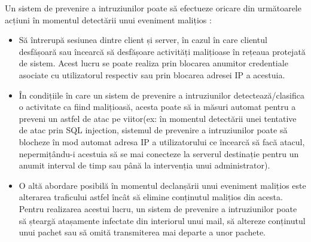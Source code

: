 Un sistem de prevenire a intruziunilor poate să efectueze oricare din următoarele acțiuni în momentul detectării unui eveniment malițios  \cite{ips_fire}:
\begin{itemize}
	\item  Să întrerupă sesiunea dintre client și server, în cazul în care clientul desfășoară sau încearcă să desfășoare activități malițioase în rețeaua protejată de sistem. Acest lucru se poate realiza prin blocarea anumitor credentiale asociate cu utilizatorul respectiv sau prin blocarea adresei IP a acestuia. 
	\item  În condițiile în care un sistem de prevenire a intruziunilor detectează/clasifica o activitate ca fiind malițioasă, acesta poate să ia măsuri automat pentru a preveni un astfel de atac pe viitor(ex: în momentul detectării unei tentative de atac prin SQL injection, sistemul de prevenire a intruziunilor poate să blocheze în mod automat adresa IP a utilizatorului ce încearcă să facă atacul, nepermițându-i acestuia să se mai conecteze la serverul destinație pentru un anumit interval de timp sau până la intervenția unui administrator). 
	\item  O altă abordare posibilă în momentul declanșării unui eveniment malițios este alterarea traficului astfel încât să elimine conținutul malițios din acesta. Pentru realizarea acestui lucru, un sistem de prevenire a intruziunilor poate să șteargă atașamente infectate din interiorul unui mail, să altereze conținutul unui pachet sau să omită transmiterea mai departe a unor pachete. 
	
\end{itemize}

